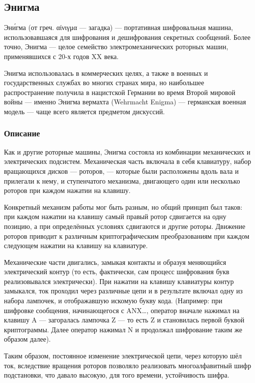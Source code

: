 \subsection{Энигма}
Эни́гма (от греч. αίνιγμα — загадка) — портативная шифровальная машина, использовавшаяся для шифрования и дешифрования секретных сообщений. Более точно, Энигма — целое семейство электромеханических роторных машин, применявшихся с 20-х годов XX века.

Энигма использовалась в коммерческих целях, а также в военных и государственных службах во многих странах мира, но наибольшее распространение получила в нацистской Германии во время Второй мировой войны — именно Энигма вермахта (Wehrmacht Enigma) — германская военная модель — чаще всего является предметом дискуссий.

\subsubsection{Описание}
Как и другие роторные машины, Энигма состояла из комбинации механических и электрических подсистем. Механическая часть включала в себя клавиатуру, набор вращающихся дисков — роторов, — которые были расположены вдоль вала и прилегали к нему, и ступенчатого механизма, двигающего один или несколько роторов при каждом нажатии на клавишу.

Конкретный механизм работы мог быть разным, но общий принцип был таков: при каждом нажатии на клавишу самый правый ротор сдвигается на одну позицию, а при определённых условиях сдвигаются и другие роторы. Движение роторов приводит к различным криптографическим преобразованиям при каждом следующем нажатии на клавишу на клавиатуре.

Механические части двигались, замыкая контакты и образуя меняющийся электрический контур (то есть, фактически, сам процесс шифрования букв реализовывался электрически). При нажатии на клавишу клавиатуры контур замыкался, ток проходил через различные цепи и в результате включал одну из набора лампочек, и отображавшую искомую букву кода. (Например: при шифровке сообщения, начинающегося с ANX…, оператор вначале нажимал на клавишу A — загоралась лампочка Z — то есть Z и становилась первой буквой криптограммы. Далее оператор нажимал N и продолжал шифрование таким же образом далее).

Таким образом, постоянное изменение электрической цепи, через которую шёл ток, вследствие вращения роторов позволяло реализовать многоалфавитный шифр подстановки, что давало высокую, для того времени, устойчивость шифра.

